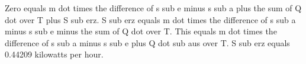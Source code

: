 Zero equals m dot times the difference of s sub e minus s sub a plus the sum of Q dot over T plus S sub erz. S sub erz equals m dot times the difference of s sub a minus s sub e minus the sum of Q dot over T. This equals m dot times the difference of s sub a minus s sub e plus Q dot sub aus over T. S sub erz equals 0.44209 kilowatts per hour.